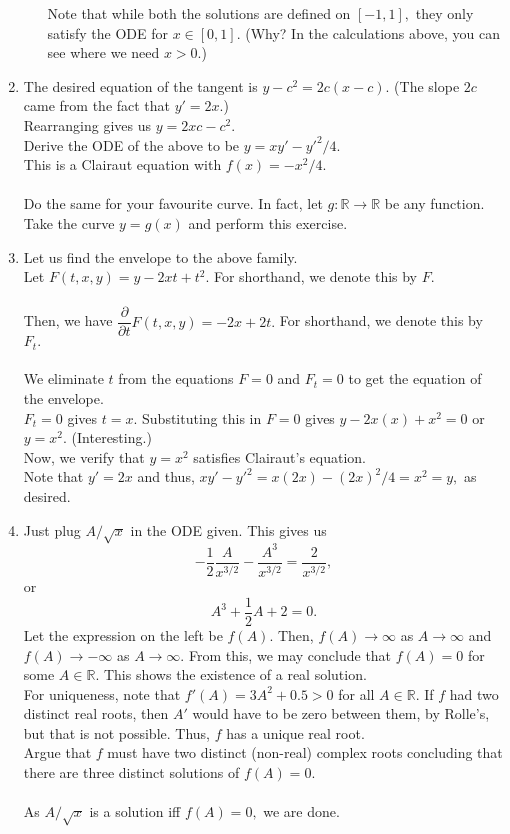 \documentclass[12pt]{article}
\begin{document}
\begin{enumerate}[label = Q.\arabic*.]
\begin{enumerate}[label = (\roman*)]
		Note that while both the solutions are defined on $[-1, 1],$ they only satisfy the ODE for $x \in [0, 1].$ \hfill (Why? In the calculations above, you can see where we need $x > 0.$)
	\end{enumerate}
	\item The desired equation of the tangent is $y - c^2 = 2c(x - c).$ (The slope $2c$ came from the fact that $y' = 2x.$)\\
	Rearranging gives us $y = 2xc - c^2.$\\
	Derive the ODE of the above to be $y = xy' - y'^2/4.$\\
	This is a Clairaut equation with $f(x) = -x^2/4.$\\~\\
	Do the same for your favourite curve. In fact, let $g:\mathbb{R}\to\mathbb{R}$ be any function. Take the curve $y = g(x)$ and perform this exercise.
	\item Let us find the envelope to the above family.\\
	Let $F(t, x, y) = y - 2xt + t^2.$ For shorthand, we denote this by $F.$\\~\\
	Then, we have $\dfrac{\partial}{\partial t}F(t, x, y) = -2x + 2t.$ For shorthand, we denote this by $F_t.$\\~\\
	We eliminate $t$ from the equations $F = 0$ and $F_t = 0$ to get the equation of the envelope.\\
	$F_t = 0$ gives $t = x.$ Substituting this in $F = 0$ gives $y - 2x(x) + x^2 = 0$ or $y = x^2.$ \hfill (Interesting.)\\
	Now, we verify that $y = x^2$ satisfies Clairaut's equation.\\
	Note that $y' = 2x$ and thus, $xy' - y'^2 = x(2x) - (2x)^2/4 = x^2 = y,$ as desired.
	\item Just plug $A/\sqrt{x}$ in the ODE given. This gives us
	\[-\frac{1}{2}\frac{A}{x^{3/2}} - \frac{A^3}{x^{3/2}} = \dfrac{2}{x^{3/2}},\]
	or
	\[A^3 + \dfrac{1}{2}A + 2 = 0.\]
	Let the expression on the left be $f(A).$ Then, $f(A) \to \infty$ as $A \to \infty$ and $f(A) \to -\infty$ as $A \to \infty.$ From this, we may conclude that $f(A) = 0$ for some $A \in \mathbb{R}.$ This shows the existence of a real solution.\\
	For uniqueness, note that $f'(A) = 3A^2 + 0.5 > 0$ for all $A \in \mathbb{R}.$ If $f$ had two distinct real roots, then $A'$ would have to be zero between them, by Rolle's, but that is not possible. Thus, $f$ has a unique real root.\\
	Argue that $f$ must have two distinct (non-real) complex roots concluding that there are three distinct solutions of $f(A) = 0.$\\~\\
	As $A/\sqrt{x}$ is a solution iff $f(A) = 0,$ we are done.
\end{enumerate}
\end{document}
